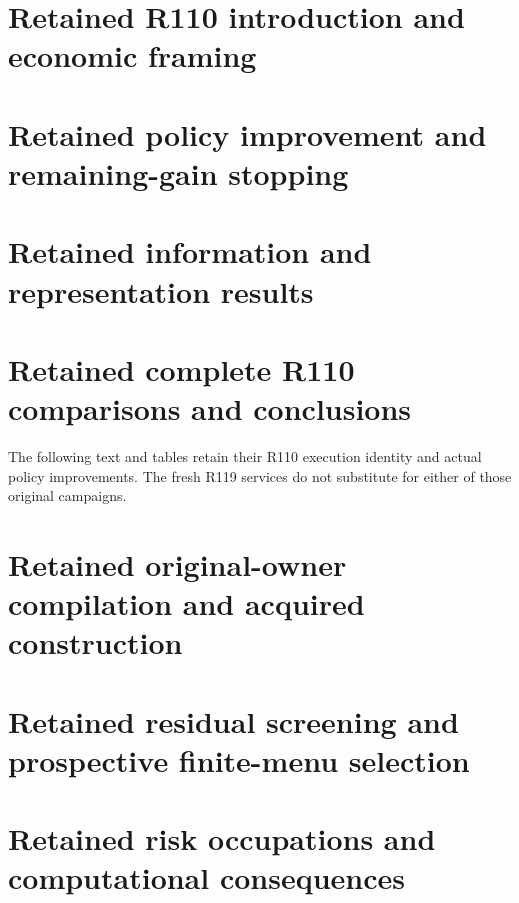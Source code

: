 \documentclass[ecta,nameyear,draft]{econsocart}
\begin{document}







\section{Retained R110 introduction and economic framing}\label{dev:intro110}

\section{Retained policy improvement and remaining-gain stopping}


\section{Retained information and representation results}



\section{Retained complete R110 comparisons and conclusions}\label{dev:custody110}
The following text and tables retain their R110 execution identity and actual
policy improvements. The fresh R119 services do not substitute for either
of those original campaigns.



\section{Retained original-owner compilation and acquired construction}\label{dev:core110}

\section{Retained residual screening and prospective finite-menu selection}\label{dev:selection110}












\section{Retained risk occupations and computational consequences}\label{sec:riskextensions99}

\end{document}
